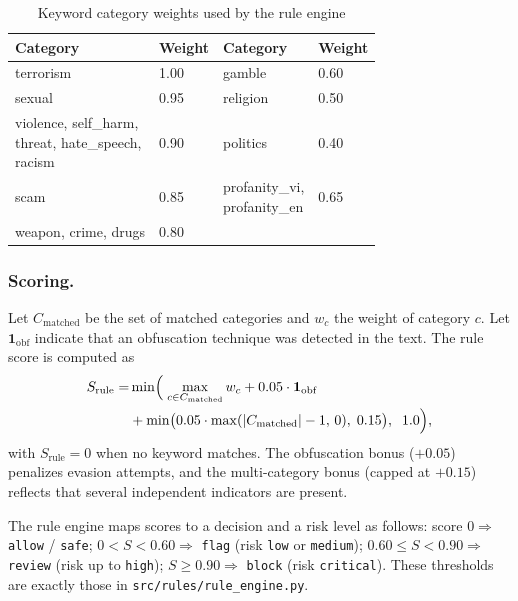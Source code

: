 \documentclass[runningheads]{llncs}
\begin{document}
\begin{table}
\centering\footnotesize
\caption{Keyword category weights used by the rule engine}\label{tab:categories}
\begin{tabular}{@{}llll@{}}
\hline
\textbf{Category} & \textbf{Weight} & \textbf{Category} & \textbf{Weight} \\
\hline
terrorism & 1.00 & gamble & 0.60 \\
sexual & 0.95 & religion & 0.50 \\
\shortstack{violence, self\_harm,\\ threat, hate\_speech,\\ racism} & 0.90 & politics & 0.40 \\
scam & 0.85 & \shortstack{profanity\_vi,\\ profanity\_en} & 0.65 \\
weapon, crime, drugs & 0.80 & & \\
\hline
\end{tabular}
\end{table}

\subsubsection{Scoring.}
Let $C_{\mathrm{matched}}$ be the set of matched categories and $w_c$ the weight of category $c$.
Let $\mathbf{1}_{\mathrm{obf}}$ indicate that an obfuscation technique was detected in the text.
The rule score is computed as
\begin{equation}
\label{eq:rule}
\begin{aligned}
S_{\mathrm{rule}} = &\min\Bigl(\; \max_{c \in C_{\mathrm{matched}}} w_c + 0.05 \cdot \mathbf{1}_{\mathrm{obf}} \\
&+ \min\bigl(0.05 \cdot \max(\lvert C_{\mathrm{matched}}\rvert - 1,\, 0),\; 0.15\bigr),\;\; 1.0 \Bigr),
\end{aligned}
\end{equation}
with $S_{\mathrm{rule}} = 0$ when no keyword matches.
The obfuscation bonus ($+0.05$) penalizes evasion attempts, and the multi-category bonus (capped at $+0.15$) reflects that several independent indicators are present.

The rule engine maps scores to a decision and a risk level as follows: score $0 \Rightarrow$ \texttt{allow} / \texttt{safe}; $0 < S < 0.60 \Rightarrow$ \texttt{flag} (risk \texttt{low} or \texttt{medium}); $0.60 \le S < 0.90 \Rightarrow$ \texttt{review} (risk up to \texttt{high}); $S \ge 0.90 \Rightarrow$ \texttt{block} (risk \texttt{critical}).
These thresholds are exactly those in \texttt{src/rules/rule\_engine.py}.
\end{document}
